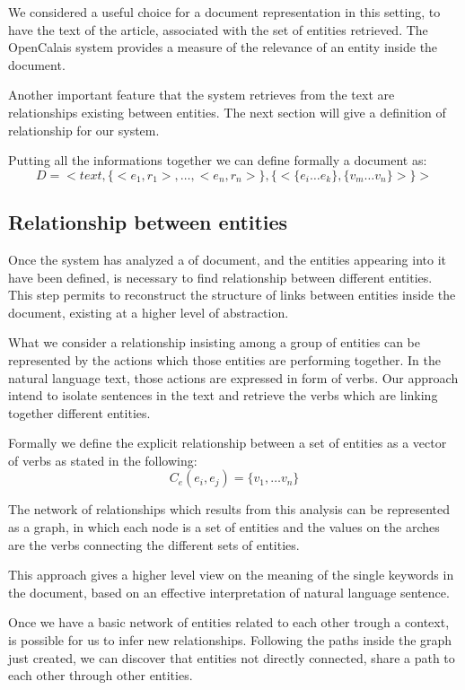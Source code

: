 \documentclass{acm_proc_article-sp-sigmod07}
\begin{document}
We considered a useful choice for a document representation in this
setting, to have the text of the article, associated with the set of
entities retrieved.
The OpenCalais system provides a measure of the relevance of an entity
inside the document.

Another important feature that the system retrieves from the text are
relationships existing between entities. The next section will give a
definition of relationship for our system.

Putting all the informations together we can define formally a document
as:
$$
D = <text, \{<e_{1},r_{1}>, \dots, <e_{n}, r_{n}>\}, \{<\{e_{i} \dots e_{k}\}, \{v_{m} \dots v_{n} \}>\}>
$$

\subsection{Relationship between entities}
Once the system has analyzed a of document, and the entities
appearing into it have been defined, is necessary to find relationship
between different entities. This step permits to reconstruct the structure
of links between entities inside the document, existing at a
higher level of abstraction.

What we consider a relationship insisting among a group of entities can be
represented by the actions which those entities are performing together.
In the natural language text, those actions are expressed in form of
verbs. Our approach intend to isolate sentences in the text and retrieve
the verbs which are linking together different entities.

Formally we define the explicit relationship between a set of entities as a
vector of verbs as stated in the following:
$$
C_{e}(e_{i}, e_{j}) = \{v_{1}, \dots v_{n}\}
$$

The network of relationships which results from this analysis can be
represented as a graph, in which each node is a set of entities and the
values on the arches are the verbs connecting the different sets of
entities.

This approach gives a higher level view on the meaning of the single
keywords in the document, based on an effective interpretation of natural
language sentence.

Once we have a basic network of entities related to each other trough
a context, is possible for us to infer new relationships. Following the
paths inside the graph just created, we can discover that entities not
directly connected, share a path to each other through other entities.
\end{document}
